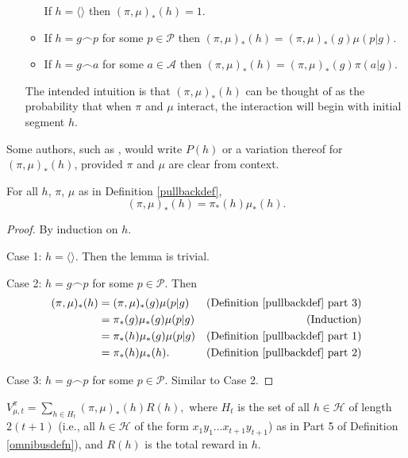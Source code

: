 \documentclass[runningheads]{llncs}
\begin{document}
\begin{definition}
\begin{enumerate}
\begin{itemize}
            If $h=\langle\rangle$ then $(\pi,\mu)_*(h)=1$.
            \item
            If $h=g\frown p$ for some $p\in\mathcal P$ then
            $(\pi,\mu)_*(h)=(\pi,\mu)_*(g)\mu(p|g)$.
            \item
            If $h=g\frown a$ for some $a\in\mathcal A$ then
            $(\pi,\mu)_*(h)=(\pi,\mu)_*(g)\pi(a|g)$.
        \end{itemize}
        The intended intuition is that $(\pi,\mu)_*(h)$ can be thought of as
        the probability that when $\pi$ and $\mu$ interact, the interaction
        will begin with initial segment $h$.
    \end{enumerate}
\end{definition}

Some authors, such as \cite{hutter2009discrete}, would write $P(h)$ or a variation thereof
for $(\pi,\mu)_*(h)$, provided $\pi$ and $\mu$ are clear from context.

\begin{lemma}
\label{factorizationlemma}
    For all $h$, $\pi$, $\mu$ as in Definition \ref{pullbackdef},
    \[
        (\pi,\mu)_*(h) = \pi_*(h)\mu_*(h).
    \]
\end{lemma}

\begin{proof}
    By induction on $h$.

    Case 1: $h=\langle\rangle$. Then the lemma is trivial.

    Case 2: $h=g\frown p$ for some $p\in\mathcal P$.
        Then
        \begin{align*}
            (\pi,\mu)_*(h)
                &= (\pi,\mu)_*(g)\mu(p|g)
                    &\mbox{(Definition \ref{pullbackdef} part 3)}\\
                &= \pi_*(g)\mu_*(g)\mu(p|g)
                    &\mbox{(Induction)}\\
                &= \pi_*(h)\mu_*(g)\mu(p|g)
                    &\mbox{(Definition \ref{pullbackdef} part 1)}\\
                &= \pi_*(h)\mu_*(h).
                    &\mbox{(Definition \ref{pullbackdef} part 2)}
        \end{align*}

    Case 3: $h=g\frown p$ for some $p\in\mathcal P$.
        Similar to Case 2.
\end{proof}

\begin{lemma}
\label{basicprobabilitylemma}
    $V^\pi_{\mu,t}=\sum_{h\in H_t}(\pi,\mu)_*(h)R(h),$
    where $H_t$ is the set of all $h\in\mathcal H$
    of length $2(t+1)$ (i.e., all $h\in\mathcal H$ of the form
    $x_1y_1\ldots x_{t+1}y_{t+1}$)
    as in Part 5 of Definition \ref{omnibusdefn}),
    and $R(h)$ is the total reward in $h$.
\end{lemma}
\end{document}
